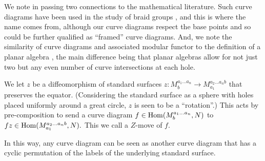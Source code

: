 \documentclass[aps, prl, letterpaper, twocolumn, superscriptaddress, notitlepage, 10pt]{revtex4-1}
\begin{document}

We note in passing two connections to the mathematical literature.
Such curve diagrams have been 
used in the study of braid groups \cite{Dehornoy2002}, and this
is where the name comes from, although our
curve diagrams respect the base points and so could be further
qualified as ``framed'' curve diagrams.
And, we note the similarity of curve diagrams and associated
modular functor 
to the definition of a planar algebra \cite{Jones1999},
the main difference being that planar algebras allow for 
not just two but any even number of curve intersections at each hole.


We let $z$ be a diffeomorphism of standard surfaces 
$z : M^{a_1...a_n}_{b} \to  M^{a_2...a_n{b}}_{{a_1}}$
that preserves the equator.
(Considering the standard surface as a sphere with holes
placed uniformly around a great circle, $z$ is seen to
be a ``rotation''.)
This acts by pre-composition to
send a curve diagram $f\in {\mathrm{Hom}}(M^{a_1...a_n}_{b}, N)$ to 
$fz \in {\mathrm{Hom}}(M^{a_2...a_n{b}}_{{a_1}}, N).$
This we call a $Z$-move of $f.$

In this way, any curve diagram can be seen as another
curve diagram that has a cyclic permutation of the labels of
the underlying standard surface.
\end{document}
